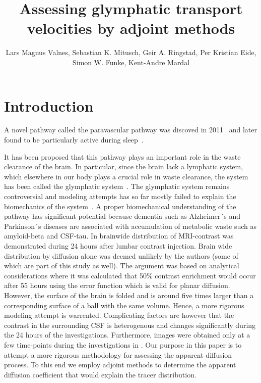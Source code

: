 \documentclass[11pt,a4paper]{article}
\title{Assessing glymphatic transport velocities by adjoint methods}
\author{Lars Magnus Valnes, Sebastian K. Mitusch, Geir A. Ringstad, Per Kristian Eide, Simon W. Funke, Kent-Andre Mardal }
\begin{document}
\maketitle

\begin{abstract}
\end{abstract}
\section{Introduction}

A novel pathway called the paravascular pathway was discoved in 2011~\cite{iliff2012paravascular} and later found to be particularly active during sleep~\cite{xie2013sleep}. 

It has been proposed that this pathway plays an important role in the waste
clearance of the brain. In particular, since the brain lack a lymphatic system, 
which elsewhere in our body plays a crucial role in waste clearance, the system has been called the glymphatic system~\cite{jessen2015glymphatic}.  
The glymphatic system remains controversial and modeling attempts
has so far mostly failed to explain the biomechanics of the system~\cite{holter2017interstitial, smith2017glymphatic}. A proper biomechanical 
understanding of the pathway has significant potential because
dementia such as Alzheimer´s and Parkinson´s diseases are
associated with accumulation of metabolic waste such as
amyloid-beta and CSF-tau.  
In \cite{ringstad2018brain} brainwide distribution of MRI-contrast was demonstrated during 24 hours after lumbar contrast injection. Brain wide distribution by diffusion alone was deemed unlikely by the authors (some of which are part 
of this study as well). The argument was based on analytical considerations where it was calculated that 50\% contrast enrichment would occur after 
55 hours using the error function which is valid for planar diffusion. However, 
the surface of the brain is folded and is around five times larger than 
a corresponding surface of a ball with the same volume. Hence, 
a more rigorous modeling attempt is warrented. Complicating factors
are however that the contrast in the surrounding CSF is heterogenous
and changes significantly during the 24 hours of the investigations. 
Furthermore, images were obtained only at a few time-points during the investigations in \cite{ringstad2018brain}.  
Our purpose in this paper is to attempt a more rigorous methodology 
for assessing the apparent diffusion process. To this end we employ
adjoint methods to determine the apparent diffusion coefficient 
that would explain the tracer distribution.  
  
\end{document}
